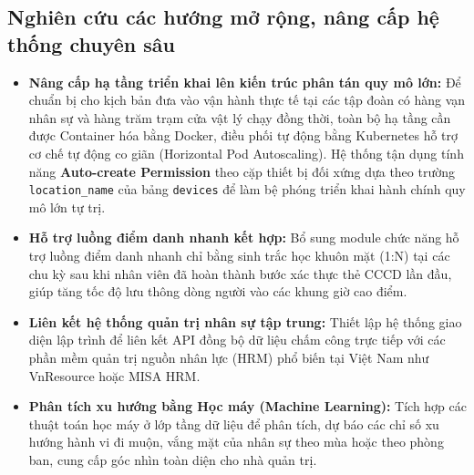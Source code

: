 ﻿\documentclass[../DoAn.tex]{subfiles}
\begin{document}
\subsection{Nghiên cứu các hướng mở rộng, nâng cấp hệ thống chuyên sâu}
\begin{itemize}
    \item \textbf{Nâng cấp hạ tầng triển khai lên kiến trúc phân tán quy mô lớn:} Để chuẩn bị cho kịch bản đưa vào vận hành thực tế tại các tập đoàn có hàng vạn nhân sự và hàng trăm trạm cửa vật lý chạy đồng thời, toàn bộ hạ tầng cần được Container hóa bằng Docker, điều phối tự động bằng Kubernetes hỗ trợ cơ chế tự động co giãn (Horizontal Pod Autoscaling). Hệ thống tận dụng tính năng \textbf{Auto-create Permission} theo cặp thiết bị đối xứng dựa theo trường \texttt{location\_name} của bảng \texttt{devices} để làm bệ phóng triển khai hành chính quy mô lớn tự trị.
    \item \textbf{Hỗ trợ luồng điểm danh nhanh kết hợp:} Bổ sung module chức năng hỗ trợ luồng điểm danh nhanh chỉ bằng sinh trắc học khuôn mặt (1:N) tại các chu kỳ sau khi nhân viên đã hoàn thành bước xác thực thẻ CCCD lần đầu, giúp tăng tốc độ lưu thông dòng người vào các khung giờ cao điểm.
    \item \textbf{Liên kết hệ thống quản trị nhân sự tập trung:} Thiết lập hệ thống giao diện lập trình để liên kết API đồng bộ dữ liệu chấm công trực tiếp với các phần mềm quản trị nguồn nhân lực (HRM) phổ biến tại Việt Nam như VnResource hoặc MISA HRM.
    \item \textbf{Phân tích xu hướng bằng Học máy (Machine Learning):} Tích hợp các thuật toán học máy ở lớp tầng dữ liệu để phân tích, dự báo các chỉ số xu hướng hành vi đi muộn, vắng mặt của nhân sự theo mùa hoặc theo phòng ban, cung cấp góc nhìn toàn diện cho nhà quản trị.
\end{itemize}
\end{document}
